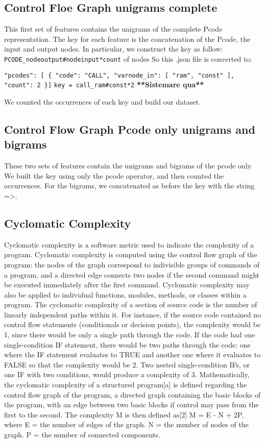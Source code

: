 \subsection{Control Floe Graph unigrams complete}
This first set of features contains the unigrams of the complete Pcode representation. The key for each feature is the concatenation of the Pcode, the input and output nodes. In particular, we construct the key as follow:
\texttt{PCODE\_nodeoutput\#nodeinput*count} of nodes
So this .json file  is converted to:

\texttt{"pcodes": [
\{
	"code": "CALL",
	"varnode\_in": [
	"ram",
	"const"
	],
	"count": 2
\}]}
\texttt{key = call\_ram\#const*2}
\textbf{**Sistemare qua**}

We counted the occurrences of each key and build our dataset.

\subsection{Control Flow Graph Pcode only unigrams and bigrams}

These two sets of features contain the unigrams and bigrams of the pcode only. We built the key using only the pcode operator, and then counted the occurrences. For the bigrams, we concatenated as before the key with the string =>.

\subsection{Cyclomatic Complexity}
Cyclomatic complexity is a software metric used to indicate the complexity of a program. Cyclomatic complexity is computed using the control flow graph of the program: the nodes of the graph correspond to indivisible groups of commands of a program, and a directed edge connects two nodes if the second command might be executed immediately after the first command. Cyclomatic complexity may also be applied to individual functions, modules, methods, or classes within a program. The cyclomatic complexity of a section of source code is the number of linearly independent paths within it. For instance, if the source code contained no control flow statements (conditionals or decision points), the complexity would be 1, since there would be only a single path through the code. If the code had one single-condition IF statement, there would be two paths through the code: one where the IF statement evaluates to TRUE and another one where it evaluates to FALSE so that the complexity would be 2. Two nested single-condition IFs, or one IF with two conditions, would produce a complexity of 3.
Mathematically, the cyclomatic complexity of a structured program[a] is defined regarding the control flow graph of the program, a directed graph containing the basic blocks of the program, with an edge between two basic blocks if control may pass from the first to the second. The complexity M is then defined as[2]
M = E - N + 2P,
where
E = the number of edges of the graph.
N = the number of nodes of the graph.
P = the number of connected components.

